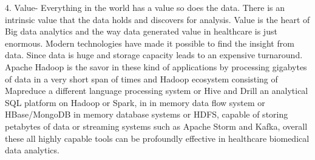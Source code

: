 \documentclass[sigconf]{acmart}
\begin{document}
4. Value- Everything in the world has a value so does the data. There is an intrinsic value that the data holds and discovers for analysis. Value is the heart of Big data analytics and the way data generated value in healthcare is just enormous. Modern technologies have made it possible to find the insight from data.  Since data is huge and storage capacity leads to an expensive turnaround. Apache Hadoop is the savor in these kind of applications by processing gigabytes of data in a very short span of times and Hadoop ecosystem consisting of Mapreduce a different language processing system or Hive and Drill an analytical SQL platform on Hadoop or Spark, in in memory data flow system or HBase/MongoDB in memory database systems or HDFS, capable of storing petabytes of data or streaming systems such as Apache Storm and Kafka, overall these all highly capable tools can be profoundly effective in healthcare biomedical data analytics.
\end{document}
